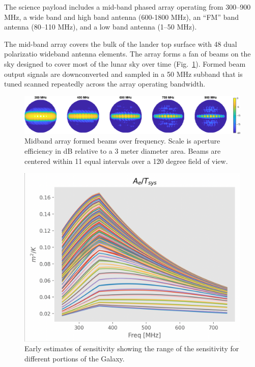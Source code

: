 The science payload includes a mid-band phased array operating from 300--900 MHz, a wide band and high band antenna (600-1800 MHz), an ``FM'' band antenna (80--110 MHz), and a low band antenna (1--50 MHz). 

The mid-band array covers the bulk of the lander top surface with 48 dual polarizatio wideband antenna elements. The array forms a fan of beams on the sky designed to cover most of the lunar sky over time (Fig.\ \ref{fig:midband_beam_maps}). Formed beam output signals are downconverted and sampled in a  50 MHz subband that is tuned scanned repeatedly across the array operating bandwidth. 

\begin{figure}
	\centering
	\includegraphics[width=\linewidth]{figures/midband_array_28cm_3dBSLL_beams_max.eps}
	\caption{Midband array formed beams over frequency. Scale is aperture efficiency in dB relative to a 3 meter diameter area. Beams are centered within 11 equal intervals over a 120 degree field of view.}
	\label{fig:midband_beam_maps}
\end{figure}

\begin{figure}
	\centering
	\includegraphics[width=0.5\linewidth]{figures/sensitivity_early_est.png}
	\caption{Early estimates of sensitivity showing the range of the sensitivity for different portions of the Galaxy.\label{sensitivity}}
\end{figure}
